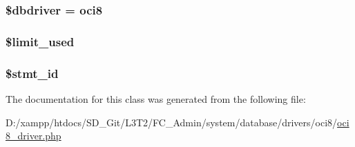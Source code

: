 \subsubsection[{\$dbdriver}]{\setlength{\rightskip}{0pt plus 5cm}\$dbdriver = \textquotesingle{}oci8\textquotesingle{}}\label{class_c_i___d_b__oci8__driver_a0cde2a16322a023d040aa7f725877597}
\hypertarget{class_c_i___d_b__oci8__driver_a96df35d7e3e76bef21ebb80234fe59e8}{}
\subsubsection[{\$limit\+\_\+used}]{\setlength{\rightskip}{0pt plus 5cm}\$limit\+\_\+used}\label{class_c_i___d_b__oci8__driver_a96df35d7e3e76bef21ebb80234fe59e8}
\hypertarget{class_c_i___d_b__oci8__driver_a1a97f17fd259cd27c73b65e6c3706ec0}{}
\subsubsection[{\$stmt\+\_\+id}]{\setlength{\rightskip}{0pt plus 5cm}\$stmt\+\_\+id}\label{class_c_i___d_b__oci8__driver_a1a97f17fd259cd27c73b65e6c3706ec0}


The documentation for this class was generated from the following file\+:\begin{DoxyCompactItemize}
\item 
D\+:/xampp/htdocs/\+S\+D\+\_\+\+Git/\+L3\+T2/\+F\+C\+\_\+\+Admin/system/database/drivers/oci8/\hyperlink{oci8__driver_8php}{oci8\+\_\+driver.\+php}\end{DoxyCompactItemize}
